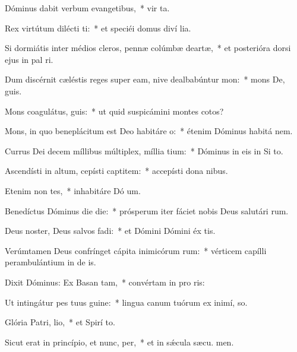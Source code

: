 \item Dóminus dabit verbum evangetibus,~* vir ta.
\item Rex virtútum dilécti ti:~* et speciéi domus diví lia.
\item Si dormiátis inter médios cleros, pennæ colúmbæ deartæ,~* et posterióra dorsi ejus in pal ri.
\item Dum discérnit cæléstis reges super eam, nive dealbabúntur  mon:~* mons De,  guis.
\item Mons coagulátus,  guis:~* ut quid suspicámini montes cotos?
\item Mons, in quo beneplácitum est Deo habitáre  o:~* étenim Dóminus habitá  nem.
\item Currus Dei decem míllibus múltiplex, míllia tium:~* Dóminus in eis in Si  to.
\item Ascendísti in altum, cepísti captitem:~* accepísti dona  nibus.
\item Etenim non tes,~* inhabitáre Dó um.
\item Benedíctus Dóminus die die:~* prósperum iter fáciet nobis Deus salutári rum.
\item Deus noster, Deus salvos fadi:~* et Dómini Dómini éx tis.
\item Verúmtamen Deus confrínget cápita inimicórum rum:~* vérticem capílli perambulántium in de is.
\item Dixit Dóminus: Ex Basan tam,~* convértam in pro ris:
\item Ut intingátur pes tuus  guine:~* lingua canum tuórum ex inimí,  so.
\item Glória Patri,  lio,~* et Spirí to.
\item Sicut erat in princípio, et nunc,  per,~* et in sǽcula sæcu. men.
